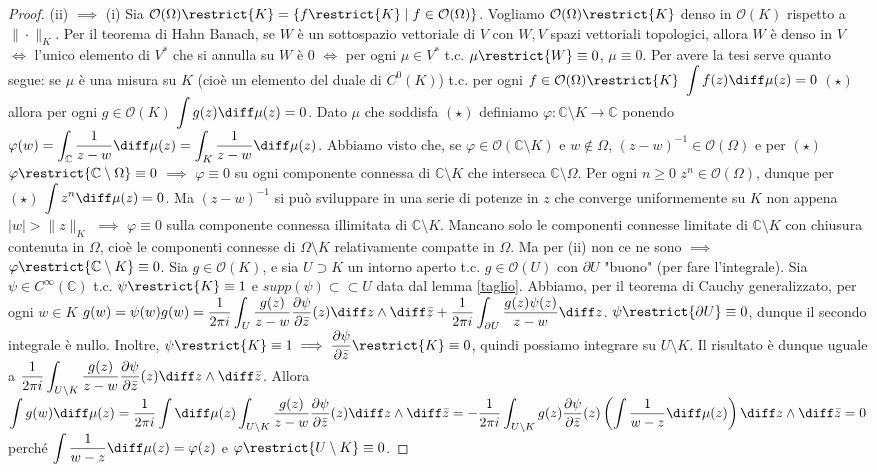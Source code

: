 \begin{proof}
  (ii) $\implies$ (i) Sia $\mathcal{O}(\Omega)\restrict{K}=\{f\restrict{K} \mid f \in \mathcal{O}(\Omega)\}$. Vogliamo $\mathcal{O}(\Omega)\restrict{K}$ denso in $\mathcal{O}(K)$ rispetto a $\|\cdot\|_K$.
  Per il teorema di Hahn Banach, se $W$ è un sottospazio vettoriale di $V$ con $W, V$ spazi vettoriali topologici, allora $W$ è denso in $V$ $\iff$ l'unico elemento di $V^*$ che si annulla su $W$ è $0$ $\iff$ per ogni $\mu \in V^*$ t.c. $\mu\restrict{W}\equiv 0$, $\mu \equiv 0$.
  Per avere la tesi serve quanto segue: se $\mu$ è una misura su $K$ (cioè un elemento del duale di $C^0(K)$) t.c. per ogni $f \in \mathcal{O}(\Omega)\restrict{K}$ $\displaystyle \int f(z)\diff\mu(z)=0$ $(\star)$ allora per ogni $g \in \mathcal{O}(K)$ $\displaystyle \int g(z)\diff\mu(z)=0$.
  Dato $\mu$ che soddisfa $(\star)$ definiamo $\varphi:\mathbb{C}\setminus K \longrightarrow \mathbb{C}$ ponendo $\displaystyle \varphi(w)=\int_{\mathbb{C}} \frac{1}{z-w}\diff\mu(z)=\int_K \frac{1}{z-w}\diff\mu(z)$.
  Abbiamo visto che, se $\varphi \in \mathcal{O}(\mathbb{C}\setminus K)$ e $w\not\in\Omega$, $(z-w)^{-1} \in \mathcal{O}(\Omega)$ e per $(\star)$ $\varphi\restrict{\mathbb{C}\setminus \Omega}\equiv 0$ $\implies$ $\varphi \equiv 0$ su ogni componente connessa di $\mathbb{C}\setminus K$ che interseca $\mathbb{C}\setminus\Omega$.
  Per ogni $n \ge 0$ $z^n \in \mathcal{O}(\Omega)$, dunque per $(\star)$ $\displaystyle \int z^n \diff\mu(z)=0$. Ma $(z-w)^{-1}$ si può sviluppare in una serie di potenze in $z$ che converge uniformemente su $K$ non appena $|w|>\|z\|_K$ $\implies$ $\varphi \equiv 0$ sulla componente connessa illimitata di $\mathbb{C}\setminus K$.
  Mancano solo le componenti connesse limitate di $\mathbb{C}\setminus K$ con chiusura contenuta in $\Omega$, cioè le componenti connesse di $\Omega\setminus K$ relativamente compatte in $\Omega$. Ma per (ii) non ce ne sono $\implies$ $\varphi\restrict{\mathbb{C}\setminus K}\equiv 0$. Sia $g \in \mathcal{O}(K)$, e sia $U \supset K$ un intorno aperto t.c. $g \in \mathcal{O}(U)$ con $\partial U$ "buono" (per fare l'integrale).
  Sia $\psi \in C^{\infty}(\mathbb{C})$ t.c. $\psi\restrict{K}\equiv 1$ e $supp(\psi) \subset \subset U$ data dal lemma \ref{taglio}.
  Abbiamo, per il teorema di Cauchy generalizzato, per ogni $w \in K$ $\displaystyle g(w)=\psi(w)g(w)=\frac{1}{2\pi i}\int_U \frac{g(z)}{z-w}\frac{\partial \psi}{\partial \bar{z}}(z)\diff z\wedge\diff\bar{z}+\frac{1}{2\pi i}\int_{\partial U} \frac{g(z)\psi(z)}{z-w}\diff z$.
  $\psi \restrict{\partial U}\equiv 0$, dunque il secondo integrale è nullo. Inoltre, $\psi\restrict{K}\equiv 1 \implies \dfrac{\partial \psi}{\partial \bar{z}}\restrict{K}\equiv 0$, quindi possiamo integrare su $U \setminus K$.
  Il risultato è dunque uguale a $\displaystyle \frac{1}{2\pi i}\int_{U \setminus K} \frac{g(z)}{z-w}\frac{\partial \psi}{\partial\bar{z}}(z)\diff z\wedge\diff\bar{z}$.
  Allora $\displaystyle \int g(w)\diff\mu(z)=\frac{1}{2\pi i}\int \diff\mu(z)\int_{U\setminus K} \frac{g(z)}{z-w}\frac{\partial \psi}{\partial\bar{z}}(z)\diff z\wedge\diff\bar{z}=-\frac{1}{2\pi i}\int_{U\setminus K} g(z)\frac{\partial \psi}{\partial\bar{z}}(z)\left(\int \frac{1}{w-z} \diff\mu(z)\right)\diff z\wedge\diff\bar{z}=0$ perché $\displaystyle \int \frac{1}{w-z} \diff\mu(z)=\varphi(z)$ e $\varphi\restrict{U \setminus K}\equiv 0$.


\end{proof}
